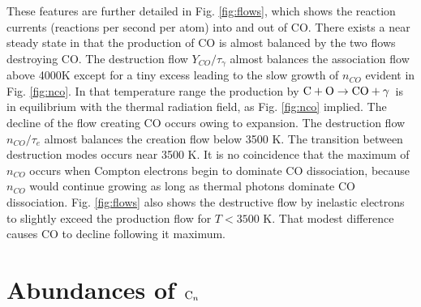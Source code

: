 \documentclass[manuscript]{aastex}
\newcommand{\cenn}{{\rm C}_n}
\newcommand{\cotoco}{${\rm C} + {\rm O} \to {\rm CO} + \gamma$}
\begin{document}
\begin{CJK*}{UTF8}{gbsn}
These features are further detailed in Fig. \ref{fig:flows},
which shows the reaction
currents (reactions per second per atom) into and out of CO. There exists a
near steady state in that the production of CO is almost balanced by the
two flows destroying CO. The destruction flow $Y_{CO}/\tau_\gamma$
almost balances the
association flow above 4000K except for a tiny excess leading to the
slow growth of $n_{CO}$ evident in Fig. \ref{fig:nco}. In that temperature 
range the
production by \cotoco\ is in equilibrium with the thermal radiation field,
as Fig. \ref{fig:nco} implied. The decline of the flow creating CO occurs owing
to expansion. The destruction flow $n_{CO}/\tau_e$ almost balances the
creation flow below 3500 K. The transition between destruction modes occurs
near 3500 K. It is no coincidence that the maximum of $n_{CO}$ occurs when
Compton electrons begin to dominate CO dissociation, because $n_{CO}$ would
continue growing as long as thermal photons dominate CO dissociation. 
Fig. \ref{fig:flows} also shows the destructive flow by inelastic electrons
to slightly exceed the production flow for $T < 3500$ K. That modest difference
causes CO to decline following it maximum. 

\section{Abundances of $\cenn$}


\end{CJK*}
\end{document}
